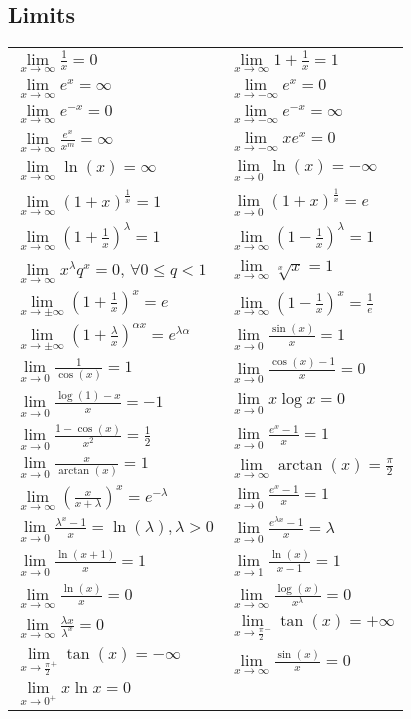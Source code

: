\documentclass[a4paper, 10pt]{article}
\theoremstyle{definition}
\theoremstyle{named}
\begin{document}
\subsection*{Limits}
\newcommand{\limxi}{\lim\limits_{x\to\infty}}
\newcommand{\limxni}{\lim\limits_{x\to-\infty}}
\newcommand{\limx}{\lim\limits_{x\to\pm\infty}}
\newcommand{\limxz}{\lim\limits_{x\to0}}
\renewcommand{\arraystretch}{1.8}
\begin{tabularx}{\linewidth}{XX}
    $\limxi \frac{1}{x} = 0$ & $\limxi 1 + \frac{1}{x} = 1$ \\
    $\limxi e^x = \infty$ & $\limxni e^x = 0$ \\
    $\limxi e^{-x} = 0$ & $\limxni e^{-x} = \infty$ \\
    $\limxi \frac{e^x}{x^m} = \infty$ & $\limxni xe^x = 0$ \\
    $\limxi \ln(x) = \infty$ & $\limxz \ln(x) = -\infty$ \\
    $\limxi (1 + x)^\frac{1}{x} = 1$ & $\limxz (1 + x)^\frac{1}{x} = e$ \\
    $\limxi (1 + \frac{1}{x})^\lambda = 1$ & $\limxi (1 - \frac{1}{x})^\lambda = 1$ \\
    $\limxi x^\lambda q^x = 0$, $\forall 0 \leq q < 1$ & $\limxi \sqrt[x]{x} = 1$ \\
    $\limx (1 + \frac{1}{x})^x = e$ & $\limxi (1 - \frac{1}{x})^x = \frac{1}{e}$ \\
    $\limx (1 + \frac{\lambda}{x})^{\alpha x} = e^{\lambda \alpha}$ & $\limxz \frac{\sin(x)}{x} = 1$ \\
    $\limxz \frac{1}{\cos(x)} = 1$ & $\limxz \frac{\cos(x) - 1}{x} = 0$ \\
    $\limxz \frac{\log(1) - x}{x} = -1$ & $\limxz x \log x = 0$ \\
    $\limxz \frac{1 - \cos(x)}{x^2} = \frac{1}{2}$ & $\limxz \frac{e^x - 1}{x} = 1$ \\
    $\limxz \frac{x}{\arctan(x)} = 1$ & $\limxi \arctan(x) = \frac{\pi}{2}$ \\
    $\limxi (\frac{x}{x + \lambda})^x = e^{-\lambda}$ & $\limxz \frac{e^x - 1}{x} = 1$ \\
    $\limxz \frac{\lambda^x - 1}{x} = \ln(\lambda), \lambda > 0$ & $\limxz \frac{e^{\lambda x} - 1}{x} = \lambda$ \\
    $\limxz \frac{\ln(x+1)}{x} = 1$ & $\lim\limits_{x \to 1} \frac{\ln(x)}{x - 1} = 1$ \\
    $\limxi \frac{\ln(x)}{x} = 0$ & $\limxi \frac{\log(x)}{x^\lambda} = 0$ \\
    $\limxi \frac{\lambda x}{\lambda^x} = 0$ & $\lim\limits_{x \to \frac{\pi}{2}^-} \tan(x) = +\infty$\\
    $\lim\limits_{x \to \frac{\pi}{2}^+} \tan(x) = -\infty$ & $\limxi \frac{\sin(x)}{x} = 0$ \\
    $\lim\limits_{x \to 0^+} x \ln x = 0$
\end{tabularx}
\end{document}
